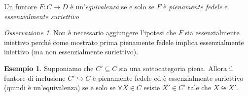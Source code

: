 \documentclass[notitlepage]{report}
\newcounter{theo}[section]\setcounter{theo}{0}
\newcounter{excounter}[section]\setcounter{excounter}{0}
\numberwithin{equation}{section}
\theoremstyle{plain}
\theoremstyle{definition}
\newtheorem{example}[excounter]{Esempio}
\theoremstyle{remark}
\newtheorem*{remark}{Osservazione}
\begin{document}
\begin{theorem}
    Un funtore \(F : C \to D\) è un'\emph{equivalenza} se e solo se \(F\) è \emph{pienamente fedele} e \emph{essenzialmente suriettivo}
\end{theorem}
\begin{remark}{}
    Non è necessario aggiungere l'ipotesi che \(F\) sia essenzialmente iniettivo
    perché come mostrato prima pienamente fedele implica essenzialmente
    iniettivo (ma non essenzialmente suriettivo).
\end{remark}
\begin{example}{}
    Supponiamo che \(C' \subseteq C \) sia una sottocategoria piena. Allora il
    funtore di inclusione \(C' \hookrightarrow C\) è pienamente fedele ed è
    essenzialmente suriettivo (quindi è un'equivalenza) se e solo se \(\forall X \in C\) esiste \(X' \in C'\) tale che \(X \cong X'\).
\end{example}
\end{document}
